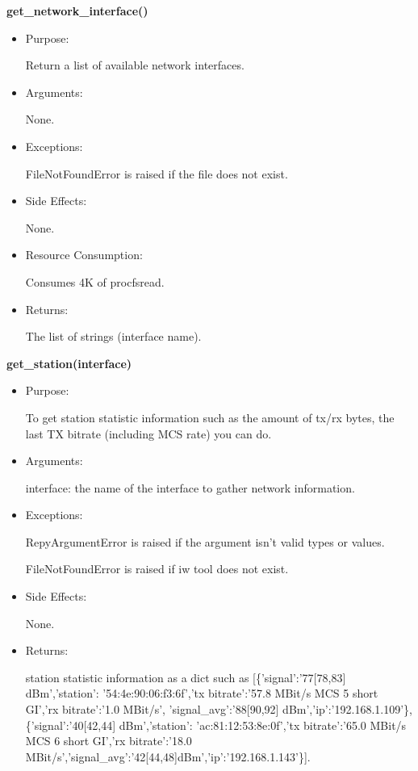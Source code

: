 \textbf{get\_network\_interface()}
\begin{itemize}
\item Purpose:

Return a list of available network interfaces.

\item Arguments:

None.

\item Exceptions:

FileNotFoundError is raised if the file does not exist.

\item Side Effects:

None.

\item Resource Consumption:

Consumes 4K of procfsread.

\item Returns:

The list of strings (interface name).

\end{itemize}

\textbf{get\_station(interface)}
\begin{itemize}
\item Purpose:

To get station statistic information such as the amount of tx/rx bytes, the last TX bitrate (including MCS rate) you can do.

\item Arguments:

interface: the name of the interface to gather network information.

\item Exceptions:

RepyArgumentError is raised if the argument isn't valid types or values.

FileNotFoundError is raised if iw tool does not exist.

\item Side Effects:

None.

\item Returns:

station statistic information as a dict such as [\{'signal':'77[78,83] dBm','station':
'54:4e:90:06:f3:6f','tx bitrate':'57.8 MBit/s MCS 5 short GI','rx bitrate':'1.0 MBit/s',
'signal\_avg':'88[90,92] dBm','ip':'192.168.1.109'\}, \{'signal':'40[42,44] dBm','station':
'ac:81:12:53:8e:0f','tx bitrate':'65.0 MBit/s MCS 6 short GI','rx bitrate':'18.0 
MBit/s','signal\_avg':'42[44,48]dBm','ip':'192.168.1.143'\}].
\end{itemize}

